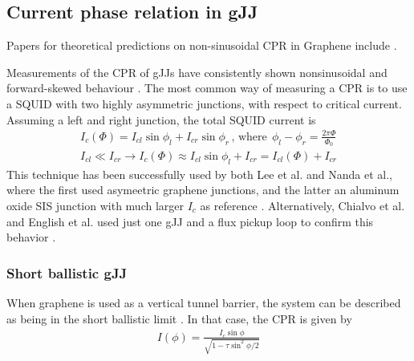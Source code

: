 \subsection{Current phase relation in gJJ}
Papers for theoretical predictions on non-sinusoidal CPR in Graphene include \cite{titovJosephsonEffectBallistic2006b,black-schafferSelfconsistentSolutionProximity2008,giritCurrentPhaseRelation2009,black-schafferStronglyAnharmonicCurrentphase2010,hagymasiJosephsonCurrentBallistic2010} .

Measurements of the CPR of gJJs have consistently shown nonsinusoidal and forward-skewed behaviour \cite{chialvoCurrentphaseRelationGraphene2010,leeUltimatelyShortBallistic2015,englishObservationNonsinusoidalCurrentphase2016,nandaCurrentPhaseRelationBallistic2017}.
The most common way of measuring a CPR is to use a SQUID with two highly asymmetric junctions, with respect to critical current.
Assuming a left and right junction, the total SQUID current is
\begin{eqnarray}
I_c(\Phi)=I_{cl}\sin\phi_l + I_{cr}\sin\phi_r \,\mathrm{,\,where\,}\; \phi_l - \phi_r = \frac{2\pi\Phi}{\Phi_0} \\%
I_{cl} \ll I_{cr} \rightarrow I_c(\Phi) \approx I_{cl}\sin\phi_l + I_{cr} = I_{cl}(\Phi) + I_{cr}
\end{eqnarray}
This technique has been successfully used by both Lee et al. and Nanda et al., where the first used asymeetric graphene junctions, and the latter an aluminum oxide SIS junction with much larger $I_c$ as reference \cite{leeUltimatelyShortBallistic2015,nandaCurrentPhaseRelationBallistic2017}.
Alternatively, Chialvo et al. and English et al. used just one gJJ and a flux pickup loop to confirm this behavior \cite{chialvoCurrentphaseRelationGraphene2010,englishObservationNonsinusoidalCurrentphase2016}.

\subsubsection{Short ballistic gJJ}
When graphene is used as a vertical tunnel barrier, the system can be described as being in the short ballistic limit \cite{leeUltimatelyShortBallistic2015}.
In that case, the CPR is given by
\begin{eqnarray}
I(\phi)=\frac{I_c\sin\phi}{\sqrt{1-\tau\sin^2\phi/2}}
\end{eqnarray}

